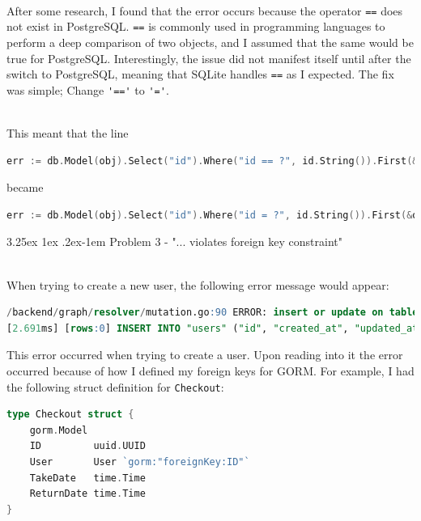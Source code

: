 \documentclass[12pt,a4paper]{article}
\makeatletter
\renewcommand\subparagraph{%
\@startsection{subparagraph}{5}{0pt}%
{3.25ex \@plus 1ex \@minus .2ex}{-1em}%
{\normalfont\normalsize\bfseries}}
\makeatother
\begin{document}
\noindent \\ After some research, I found that the error occurs because the operator \lstinline{==} does not exist in PostgreSQL. \lstinline{==} is commonly used in programming languages to perform a deep comparison of two objects, and I assumed that the same would be true for PostgreSQL.
Interestingly, the issue did not manifest itself until after the switch to PostgreSQL, meaning that SQLite handles \lstinline{==} as I expected.
The fix was simple; Change \lstinline{'=='} to \lstinline{'='}.

\noindent \\ This meant that the line

\begin{lstlisting}[language=Go]
    err := db.Model(obj).Select("id").Where("id == ?", id.String()).First(&obj).Error
\end{lstlisting}

\noindent became

\begin{lstlisting}[language=Go]
    err := db.Model(obj).Select("id").Where("id = ?", id.String()).First(&obj).Error
\end{lstlisting}

\subparagraph{Problem 3 - "... violates foreign key constraint"}

\noindent \\ When trying to create a new user, the following error message would appear:

\begin{lstlisting}[language=SQL]
/backend/graph/resolver/mutation.go:90 ERROR: insert or update on table "users" violates foreign key constraint "fk_checkouts_user" (SQLSTATE 23503)
[2.691ms] [rows:0] INSERT INTO "users" ("id", "created_at", "updated_at", "deleted_at", "first_name", "last_name", "email", "hash") VALUES [..]
\end{lstlisting}

\noindent This error occurred when trying to create a user. Upon reading into it the error occurred because of how I defined my foreign keys for GORM. For example, I had the following struct definition for \lstinline{Checkout}:

\begin{lstlisting}[language=Go]
type Checkout struct {
	gorm.Model
	ID         uuid.UUID
	User       User `gorm:"foreignKey:ID"`
	TakeDate   time.Time
	ReturnDate time.Time
}
\end{lstlisting}
\end{document}
